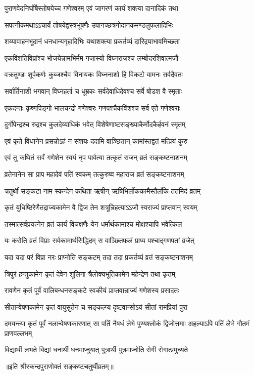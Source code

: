 \twolineshloka
{पुराणवेदनिर्घोषैस्तोषयेच्च गणेश्वरम्}
{एवं जागरणं कार्यं शक्त्या दानादिकं तथा} %


\twolineshloka
{सपत्नीकमथाऽऽचार्यं तोषयेद्वस्त्रभूषणैः}
{उपानच्छत्रगोदानकमण्डलुफलादिभिः} %


\twolineshloka
{शय्यावाहनभूदानं धनधान्यगृहादिभिः}
{यथाशक्त्या प्रकर्तव्यं दारिद्र्याभावमिच्छता} %


\twolineshloka
{एकविंशतिविप्रांश्च भोजयेन्नामभिर्मम}
{गजास्यो विघ्नराजश्च लम्बोदरशिवात्मजौ} %


\twolineshloka
{वक्रतुण्डः शूर्पकर्णः कुब्जश्चैव विनायकः}
{विघ्ननाशो हि विकटो वामनः सर्वदैवतः} %


\twolineshloka
{सर्वार्तिनाशी भगवान् विघ्नहर्ता च धूम्रकः}
{सर्वदेवाधिदेवश्च सर्वे षोडश वै स्मृताः} %


\twolineshloka
{एकदन्तः कृष्णपिङ्गो भालचन्द्रो गणेश्वरः}
{गणपश्चैकविंशश्च सर्व एते गणेश्वराः} %

\twolineshloka
{दुर्गोपेन्द्रश्च रुद्रश्च कुलदेव्याधिकं भवेत्}
{विशेषेणाष्टसङ्ख्याकैर्मोदकैर्हवनं स्मृतम्} %


\twolineshloka
{एवं कृते विधानेन प्रसन्नोऽहं न संशयः}
{ददामि वाञ्छितान् कामांस्तद्व्रतं मत्प्रियं कुरु} %


\twolineshloka
{एवं तु कथितं सर्वं गणेशेन स्वयं नृप}
{पार्वत्या तत्कृतं राजन् व्रतं सङ्कष्टनाशनम्} %


\twolineshloka
{व्रतेनानेन सा प्राप महादेवं पतिं स्वकम्}
{तत्कुरुष्व महाराज व्रतं सङ्कष्टनाशनम्} %


\twolineshloka
{चतुर्थी सङ्कटा नाम स्कन्देन कथिता ऋषीन्}
{ऋषिभिर्लोककामैस्तैर्लोके ततमिदं व्रतम्} %


\twolineshloka
{कृतं युधिष्ठिरेणैतद्राज्यकामेन वै द्विज}
{तेन शत्रून्निहत्याऽऽजौ स्वराज्यं प्राप्तवान् स्वयम्} %


\twolineshloka
{तस्मात्सर्वप्रयत्नेन व्रतं कार्यं विचक्षणैः}
{येन धर्मार्थकामाश्च मोक्षश्चापि भवेत्किल} %


\twolineshloka
{यः करोति व्रतं विप्राः सर्वकामार्थसिद्धिदम्}
{स वाञ्छितफलं प्राप्य पश्चाद्गणपतां व्रजेत्} %


\twolineshloka
{यदा यदा परं विप्रा नरः प्राप्नोति सङ्कटम्}
{तदा तदा प्रकर्तव्यं व्रतं सङ्कष्टनाशनम्} %


\twolineshloka
{त्रिपुरं हन्तुकामेन कृतं देवेन शूलिना}
{त्रैलोक्यभूतिकामेन महेन्द्रेण तथा कृतम्} %


\twolineshloka
{रावणेन कृतं पूर्वं वालिबन्धनसङ्कटे}
{स्वकीयं प्राप्तवान्राज्यं गणेशस्य प्रसादतः} %


\twolineshloka
{सीतान्वेषणकामेन कृतं वायुसुतेन च}
{सङ्कल्प्य दृष्टवान्सोऽयं सीतां रामप्रियां पुरा} %


\threelineshloka
{दमयन्त्या कृतं पूर्वं नलान्वेषणकारणात्}
{सा पतिं नैषधं लेभे पुण्यश्लोकं द्विजोत्तमाः}
{अहल्याऽपि पतिं लेभे गौतमं प्राणवल्लभम्} %

\twolineshloka
{विद्यार्थी लभते विद्यां धनार्थी धनमाप्नुयात्}
{पुत्रार्थी पुत्रमाप्नोति रोगी रोगात्प्रमुच्यते} %

\centerline{॥इति श्रीस्कन्दपुराणोक्तं सङ्कष्टचतुर्थीव्रतम्॥} %


